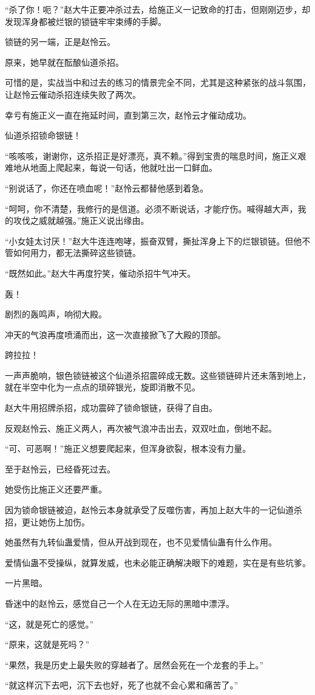 \begin{this_body}
“杀了你！呃？”赵大牛正要冲杀过去，给施正义一记致命的打击，但刚刚迈步，却发现浑身都被烂银的锁链牢牢束缚的手脚。

锁链的另一端，正是赵怜云。

原来，她早就在酝酿仙道杀招。

可惜的是，实战当中和过去的练习的情景完全不同，尤其是这种紧张的战斗氛围，让赵怜云催动杀招连续失败了两次。

幸亏有施正义一直在拖延时间，直到第三次，赵怜云才催动成功。

仙道杀招锁命银链！

“咳咳咳，谢谢你，这杀招正是好漂亮，真不赖。”得到宝贵的喘息时间，施正义艰难地从地面上爬起来，每说一句话，他就吐出一口鲜血。

“别说话了，你还在喷血呢！”赵怜云都替他感到着急。

“呵呵，你不清楚，我修行的是信道。必须不断说话，才能疗伤。喊得越大声，我的攻伐之威就越强。”施正义说出缘由。

“小女娃太讨厌！”赵大牛连连咆哮，振奋双臂，撕扯浑身上下的烂银锁链。但他不管如何用力，都无法撕碎这些锁链。

“既然如此。”赵大牛再度狞笑，催动杀招牛气冲天。

轰！

剧烈的轰鸣声，响彻大殿。

冲天的气浪再度喷涌而出，这一次直接掀飞了大殿的顶部。

跨拉拉！

一声声脆响，银色锁链被这个仙道杀招震碎成无数。这些锁链碎片还未落到地上，就在半空中化为一点点的琐碎银光，旋即消散不见。

赵大牛用招牌杀招，成功震碎了锁命银链，获得了自由。

反观赵怜云、施正义两人，再次被气浪冲击出去，双双吐血，倒地不起。

“可、可恶啊！”施正义想要爬起来，但浑身欲裂，根本没有力量。

至于赵怜云，已经昏死过去。

她受伤比施正义还要严重。

因为锁命银链被迫，赵怜云本身就承受了反噬伤害，再加上赵大牛的一记仙道杀招，更让她伤上加伤。

她虽然有九转仙蛊爱情，但从开战到现在，也不见爱情仙蛊有什么作用。

爱情仙蛊不受操纵，就算发威，也未必能正确解决眼下的难题，实在是有些坑爹。

一片黑暗。

昏迷中的赵怜云，感觉自己一个人在无边无际的黑暗中漂浮。

“这，就是死亡的感觉。”

“原来，这就是死吗？”

“果然，我是历史上最失败的穿越者了。居然会死在一个龙套的手上。”

“就这样沉下去吧，沉下去也好，死了也就不会心累和痛苦了。”

\end{this_body}

